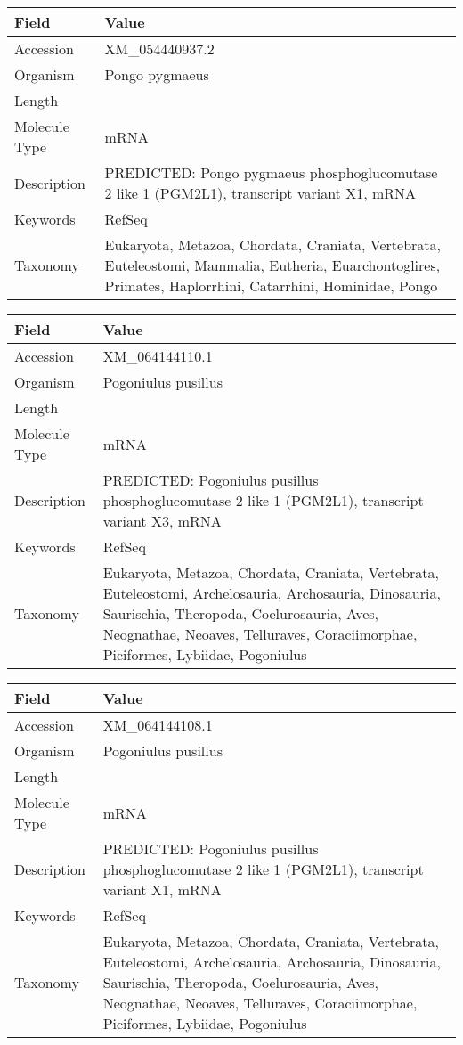 \documentclass[10pt]{article}
\begin{document}
{\footnotesize
\begin{longtable}{>{\raggedright\arraybackslash}p{4.5cm} >{\raggedright\arraybackslash}p{11.5cm}}
\textbf{Field} & \textbf{Value} \\
\hline
Accession & XM\_054440937.2 \\
Organism & Pongo pygmaeus \\
Length & 8549 \\
Molecule Type & mRNA \\
Description & PREDICTED: Pongo pygmaeus phosphoglucomutase 2 like 1 (PGM2L1), transcript variant X1, mRNA \\
Keywords & RefSeq \\
Taxonomy & Eukaryota, Metazoa, Chordata, Craniata, Vertebrata, Euteleostomi, Mammalia, Eutheria, Euarchontoglires, Primates, Haplorrhini, Catarrhini, Hominidae, Pongo \\
\end{longtable}
}

{\footnotesize
\begin{longtable}{>{\raggedright\arraybackslash}p{4.5cm} >{\raggedright\arraybackslash}p{11.5cm}}
\textbf{Field} & \textbf{Value} \\
\hline
Accession & XM\_064144110.1 \\
Organism & Pogoniulus pusillus \\
Length & 2720 \\
Molecule Type & mRNA \\
Description & PREDICTED: Pogoniulus pusillus phosphoglucomutase 2 like 1 (PGM2L1), transcript variant X3, mRNA \\
Keywords & RefSeq \\
Taxonomy & Eukaryota, Metazoa, Chordata, Craniata, Vertebrata, Euteleostomi, Archelosauria, Archosauria, Dinosauria, Saurischia, Theropoda, Coelurosauria, Aves, Neognathae, Neoaves, Telluraves, Coraciimorphae, Piciformes, Lybiidae, Pogoniulus \\
\end{longtable}
}

{\footnotesize
\begin{longtable}{>{\raggedright\arraybackslash}p{4.5cm} >{\raggedright\arraybackslash}p{11.5cm}}
\textbf{Field} & \textbf{Value} \\
\hline
Accession & XM\_064144108.1 \\
Organism & Pogoniulus pusillus \\
Length & 2904 \\
Molecule Type & mRNA \\
Description & PREDICTED: Pogoniulus pusillus phosphoglucomutase 2 like 1 (PGM2L1), transcript variant X1, mRNA \\
Keywords & RefSeq \\
Taxonomy & Eukaryota, Metazoa, Chordata, Craniata, Vertebrata, Euteleostomi, Archelosauria, Archosauria, Dinosauria, Saurischia, Theropoda, Coelurosauria, Aves, Neognathae, Neoaves, Telluraves, Coraciimorphae, Piciformes, Lybiidae, Pogoniulus \\
\end{longtable}
}
\end{document}
